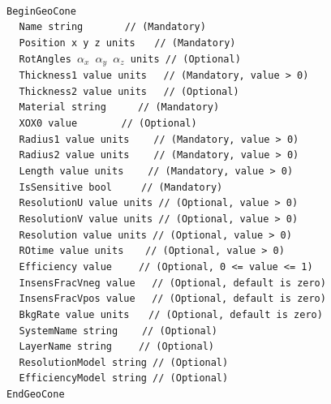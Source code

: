 ~\\
\noindent
{\tt BeginGeoCone} \\
$~~~~~${\tt Name             string                   $~~~~~~~~~~~~$   // (Mandatory)} \\
$~~~~~${\tt Position         x  y  z units                     $~~~$   // (Mandatory)} \\
$~~~~~${\tt RotAngles        $\alpha_x$  $\alpha_y$  $\alpha_z$ units  // (Optional)}  \\
$~~~~~${\tt Thickness1       value  units                       $~~$   // (Mandatory, value > 0)} \\
$~~~~~${\tt Thickness2       value  units                       $~~$   // (Optional)} \\
$~~~~~${\tt Material         string                       $~~~~~~~~$   // (Mandatory)} \\
$~~~~~${\tt XOX0             value                   $~~~~~~~~~~~~~$   // (Optional)}  \\
$~~~~~${\tt Radius1          value units                     $~~~~~$   // (Mandatory, value > 0)} \\
$~~~~~${\tt Radius2          value units                     $~~~~~$   // (Mandatory, value > 0)} \\
$~~~~~${\tt Length           value units                     $~~~~~$   // (Mandatory, value > 0)} \\
$~~~~~${\tt IsSensitive      bool                          $~~~~~~~$   // (Mandatory)} \\
$~~~~~${\tt ResolutionU      value units                               // (Optional, value > 0)} \\
$~~~~~${\tt ResolutionV      value units                               // (Optional, value > 0)} \\
$~~~~~${\tt Resolution       value units                               // (Optional, value > 0)} \\
$~~~~~${\tt ROtime           value units                      $~~~~$   // (Optional, value > 0)} \\
$~~~~~${\tt Efficiency       value                          $~~~~~~$   // (Optional, 0 <= value <= 1)} \\
$~~~~~${\tt InsensFracVneg   value                              $~~$   // (Optional, default is zero)} \\
$~~~~~${\tt InsensFracVpos   value                              $~~$   // (Optional, default is zero)} \\
$~~~~~${\tt BkgRate          value units                       $~~~$   // (Optional, default is zero)} \\
$~~~~~${\tt SystemName       string                          $~~~~~$   // (Optional)} \\
$~~~~~${\tt LayerName        string                         $~~~~~~$   // (Optional)} \\
$~~~~~${\tt ResolutionModel  string                                    // (Optional)} \\
$~~~~~${\tt EfficiencyModel  string                                    // (Optional)} \\
{\tt EndGeoCone}

